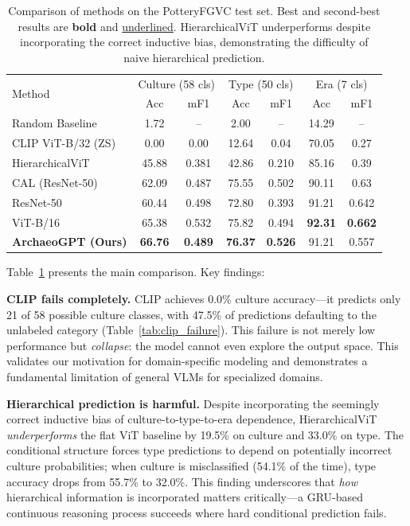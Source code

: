 \documentclass[10pt,twocolumn,letterpaper]{article}
\begin{document}
\begin{table}[t]
\centering
\caption{Comparison of methods on the PotteryFGVC test set. Best and second-best results are \textbf{bold} and \underline{underlined}. HierarchicalViT underperforms despite incorporating the correct inductive bias, demonstrating the difficulty of naive hierarchical prediction.}
\label{tab:main_results}
\small
\begin{tabular}{lcccccc}
\toprule
\multirow{2}{*}{Method} & \multicolumn{2}{c}{Culture (58 cls)} & \multicolumn{2}{c}{Type (50 cls)} & \multicolumn{2}{c}{Era (7 cls)} \\
& Acc & mF1 & Acc & mF1 & Acc & mF1 \\
\midrule
Random Baseline & 1.72 & -- & 2.00 & -- & 14.29 & -- \\
CLIP ViT-B/32 (ZS) & 0.00 & 0.00 & 12.64 & 0.04 & 70.05 & 0.27 \\
HierarchicalViT & 45.88 & 0.381 & 42.86 & 0.210 & 85.16 & 0.39 \\
CAL (ResNet-50)~\cite{rao2021counterfactual} & 62.09 & 0.487 & 75.55 & 0.502 & 90.11 & 0.63 \\
ResNet-50 & 60.44 & 0.498 & 72.80 & 0.393 & 91.21 & 0.642 \\
ViT-B/16 & 65.38 & 0.532 & 75.82 & 0.494 & \textbf{92.31} & \textbf{0.662} \\
\midrule
\textbf{ArchaeoGPT (Ours)} & \textbf{66.76} & \textbf{0.489} & \textbf{76.37} & \textbf{0.526} & 91.21 & 0.557 \\
\bottomrule
\end{tabular}
\end{table}

Table~\ref{tab:main_results} presents the main comparison. Key findings:

\textbf{CLIP fails completely.} CLIP achieves 0.0\% culture accuracy---it predicts only 21 of 58 possible culture classes, with 47.5\% of predictions defaulting to the unlabeled category (Table~\ref{tab:clip_failure}). This failure is not merely low performance but \emph{collapse}: the model cannot even explore the output space. This validates our motivation for domain-specific modeling and demonstrates a fundamental limitation of general VLMs for specialized domains.

\textbf{Hierarchical prediction is harmful.} Despite incorporating the seemingly correct inductive bias of culture-to-type-to-era dependence, HierarchicalViT \emph{underperforms} the flat ViT baseline by 19.5\% on culture and 33.0\% on type. The conditional structure forces type predictions to depend on potentially incorrect culture probabilities; when culture is misclassified (54.1\% of the time), type accuracy drops from 55.7\% to 32.0\%. This finding underscores that \emph{how} hierarchical information is incorporated matters critically---a GRU-based continuous reasoning process succeeds where hard conditional prediction fails.
\end{document}
